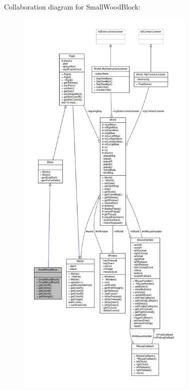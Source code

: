 Collaboration diagram for Small\+Wood\+Block\+:
\nopagebreak
\begin{figure}[H]
\begin{center}
\leavevmode
\includegraphics[height=550pt]{classSmallWoodBlock__coll__graph}
\end{center}
\end{figure}
